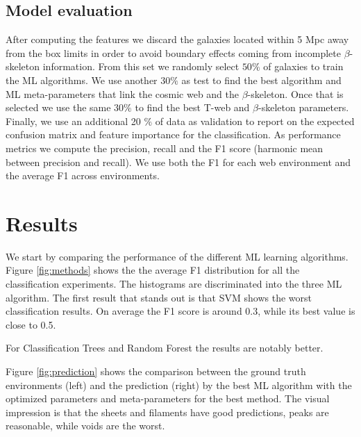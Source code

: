 \documentclass[usenatbib]{mnras}
\begin{document}
\subsection{Model evaluation}

After computing the features we discard the galaxies located within 5 Mpc
away from the box limits  in order  to avoid boundary effects coming
from incomplete $\beta$-skeleton information.  
From this set we randomly select $50\%$ of galaxies to train the ML
algorithms.   
We use another $30\%$ as test to find the best algorithm and ML
meta-parameters that link the cosmic web and the $\beta$-skeleton.  
Once that is selected we use the same $30\%$ to find the best 
T-web and $\beta$-skeleton parameters. 
Finally, we use an additional 20 $\%$ of data as validation to  report
on the expected confusion matrix and feature importance for the
classification. 
As performance metrics we compute the precision, recall and the F1
score (harmonic mean between precision and recall).  
We use both the F1 for each web environment and the average F1 across
environments. 

\section{Results}\label{sec:results}

We start by comparing the performance of the different ML learning
algorithms.
Figure \ref{fig:methods} shows the the average F1 distribution for
all the classification experiments. 
The histograms are discriminated into the three ML algorithm.
The first result that stands out is that SVM shows the worst
classification results.
On average the F1 score is around 0.3, while its best value is close
to 0.5.

For Classification Trees and Random Forest the results are notably better. 




Figure \ref{fig:prediction} shows the comparison between the ground
truth environments (left) and the prediction (right) by the best ML algorithm
with the optimized parameters and meta-parameters  for the best
method. 
The visual impression is that the sheets and filaments have good predictions,
peaks are reasonable, while voids are the worst. 
\end{document}
